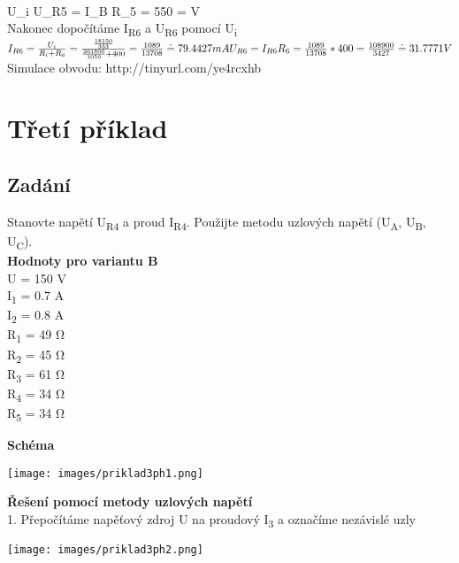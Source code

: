 \documentclass[12pt,a4paper]{article} %
\begin{document}
	    \medskip
	    \\U_i \equiv U_{R5} = I_B R_5 = 550 =   V
	    \)
	    \bigskip
	    \bigskip
	    \bigskip
	\\Nakonec dopočítáme I\textsubscript{R6} a U\textsubscript{R6} pomocí U\textsubscript{i}
    \medskip
        \(
		\\I_{R6} = \frac{U_i}{R_i + R_6} = \frac{\frac{18150}{353}}{\frac{261800}{1059}+400} = \frac{1089}{13708} \doteq 79.4427 mA
		\medskip
		\\U_{R6} = I_{R6} R_6 = \frac{1089}{13708} * 400 = \frac{108900}{3427} \doteq 31.7771 V
	    \)
	   \bigskip
		\\Simulace obvodu: http://tinyurl.com/ye4rcxhb
	\clearpage

	\section{Třetí příklad} %
		\subsection*{Zadání}
		Stanovte napětí U\textsubscript{R4} a proud I\textsubscript{R4}. Použijte metodu uzlových napětí (U\textsubscript{A},  U\textsubscript{B}, U\textsubscript{C}).
		\\\textbf{Hodnoty pro variantu B}
		\\U = 150 V
		\\I\textsubscript{1} = 0.7 A
		\\I\textsubscript{2} = 0.8 A
		\\R\textsubscript{1} = 49 \si{\ohm}
		\\R\textsubscript{2} = 45 \si{\ohm}
		\\R\textsubscript{3} = 61 \si{\ohm}
		\\R\textsubscript{4} = 34 \si{\ohm}
		\\R\textsubscript{5} = 34 \si{\ohm}
		\bigskip
				\bigskip
		
		\textbf{Schéma}
		\medskip

		\centerline{
		\texttt{[image: images/priklad3ph1.png]}
		}
		\clearpage
		\textbf{Řešení pomocí metody uzlových napětí}
		\\1. Přepočítáme napěťový zdroj U na proudový I\textsubscript{3} a označíme nezávislé uzly
		
		\centerline{
		\texttt{[image: images/priklad3ph2.png]}
		}
		
\end{document}
